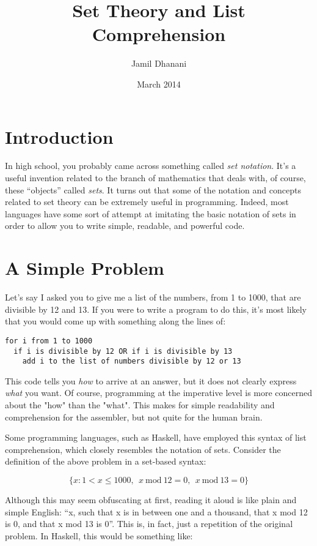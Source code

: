\documentclass{article}
\title{Set Theory and List Comprehension}
\author{Jamil Dhanani}
\date{March 2014}
\begin{document}
\maketitle

\section{Introduction}
In high school, you probably came across something called \textit{set notation}. It's a useful invention related to the branch of mathematics that deals with, of course, these ``objects'' called \textit{sets}. It turns out that some of the notation and concepts related to set theory can be extremely useful in programming. Indeed, most languages have some sort of attempt at imitating the basic notation of sets in order to allow you to write simple, readable, and powerful code.

\section{A Simple Problem}
Let's say I asked you to give me a list of the numbers, from 1 to 1000, that are divisible by 12 and 13. If you were to write a program to do this, it's most likely that you would come up with something along the lines of:

\begin{verbatim}
for i from 1 to 1000
  if i is divisible by 12 OR if i is divisible by 13
    add i to the list of numbers divisible by 12 or 13
\end{verbatim}

This code tells you \textit{how} to arrive at an answer, but it does not clearly express \textit{what} you want. Of course, programming at the imperative level is more concerned about the "how" than the "what". This makes for simple readability and comprehension for the assembler, but not quite for the human brain.

Some programming languages, such as Haskell, have employed this syntax of list comprehension, which closely resembles the notation of sets. Consider the definition of the above problem in a set-based syntax:

\begin{equation}
\{x : 1 < x \leq 1000,\>\> x \> \mathrm{mod} \> 12 = 0,\>\> x \> \mathrm{mod} \> 13 = 0\}
\end{equation}

Although this may seem obfuscating at first, reading it aloud is like plain and simple English: ``x, such that x is in between one and a thousand, that x mod 12 is 0, and that x mod 13 is 0''. This is, in fact, just a repetition of the original problem. In Haskell, this would be something like:
\end{document}
